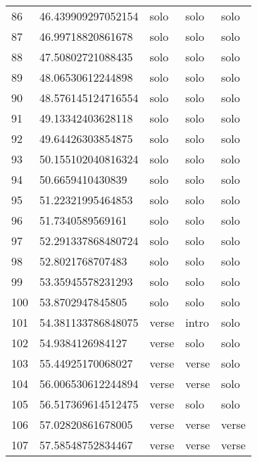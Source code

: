 \begin{table}[]
\begin{tabular}{lllll}
    86   & 46.439909297052154 & solo         & solo            & solo           \\
    87   & 46.99718820861678  & solo         & solo            & solo           \\
    88   & 47.50802721088435  & solo         & solo            & solo           \\
    89   & 48.06530612244898  & solo         & solo            & solo           \\
    90   & 48.576145124716554 & solo         & solo            & solo           \\
    91   & 49.13342403628118  & solo         & solo            & solo           \\
    92   & 49.64426303854875  & solo         & solo            & solo           \\
    93   & 50.155102040816324 & solo         & solo            & solo           \\
    94   & 50.6659410430839   & solo         & solo            & solo           \\
    95   & 51.22321995464853  & solo         & solo            & solo           \\
    96   & 51.7340589569161   & solo         & solo            & solo           \\
    97   & 52.291337868480724 & solo         & solo            & solo           \\
    98   & 52.8021768707483   & solo         & solo            & solo           \\
    99   & 53.35945578231293  & solo         & solo            & solo           \\
    100  & 53.8702947845805   & solo         & solo            & solo           \\
    101  & 54.381133786848075 & verse        & intro           & solo           \\
    102  & 54.9384126984127   & verse        & solo            & solo           \\
    103  & 55.44925170068027  & verse        & verse           & solo           \\
    104  & 56.006530612244894 & verse        & verse           & solo           \\
    105  & 56.517369614512475 & verse        & solo            & solo           \\
    106  & 57.02820861678005  & verse        & verse           & verse          \\
    107  & 57.58548752834467  & verse        & verse           & verse          \\

\end{tabular}
\end{table}
